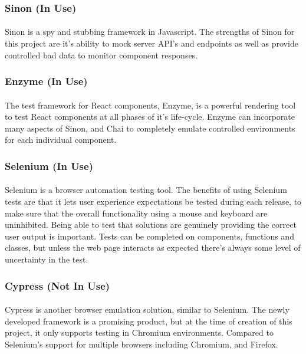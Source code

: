 \documentclass[12pt]{article}
\begin{document}
\subsubsection{Sinon (In Use)}
\paragraph{}	Sinon is a spy and stubbing framework in Javascript. The strengths of Sinon for this project are it's ability to mock server API's and endpoints as well as provide controlled bad data to monitor component responses.
\subsubsection{Enzyme (In Use)}
\paragraph{}	The test framework for React components, Enzyme, is a powerful rendering tool to test React components at all phases of it's life-cycle. Enzyme can incorporate many aspects of Sinon, and Chai to completely emulate controlled environments for each individual component.
\subsubsection{Selenium (In Use)}
\paragraph{}	Selenium is a browser automation testing tool. The benefits of using Selenium tests are that it lets user experience expectations be tested during each release, to make sure that the overall functionality using a mouse and keyboard are uninhibited. Being able to test that solutions are genuinely providing the correct user output is important. Tests can be completed on components, functions and classes, but unless the web page interacts as expected there's always some level of uncertainty in the test. 
\subsubsection{Cypress (Not In Use)}
\paragraph{}	Cypress is another browser emulation solution, similar to Selenium. The newly developed framework is a promising product, but at the time of creation of this project, it only supports testing in Chromium environments. Compared to Selenium's support for multiple browsers including Chromium, and Firefox. 
\end{document}
